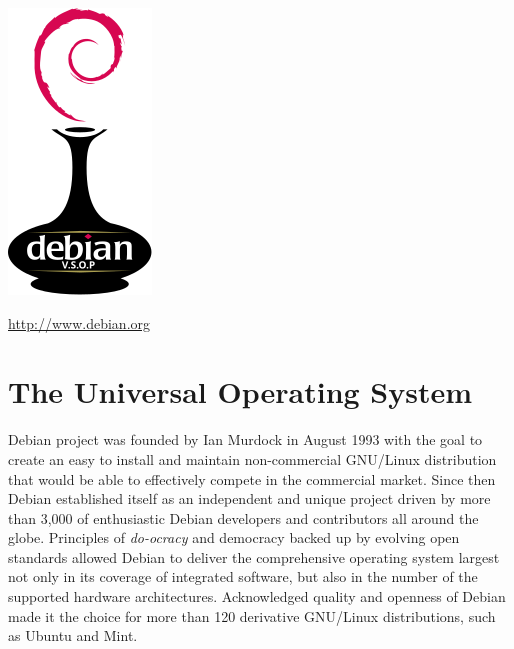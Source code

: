 \documentclass[letterpaper,landscape]{report}
\begin{document}
\begin{multicols}{3}    %

\begin{center}
\noindent
\includegraphics[width=0.5\columnwidth]{openlogo-vsop}

\url{http://www.debian.org}

\section*{The Universal Operating System}
\end{center}
\noindent
Debian project was founded by Ian Murdock in August 1993 with the goal
to create an easy to install and maintain non-commercial GNU/Linux
distribution that would be able to effectively compete in the
commercial market.  Since then Debian established itself as an
independent and unique project driven by more than 3,000 of
enthusiastic Debian developers and contributors all around the globe.
Principles of \emph{do-ocracy} and democracy backed up by evolving open
standards allowed Debian to deliver the comprehensive operating system largest not
only in its coverage of integrated software, but also in the
number of the supported hardware architectures.
Acknowledged quality and openness of Debian made it the choice for
more than 120 derivative GNU/Linux distributions, such as Ubuntu and
Mint.


\end{multicols}
\end{document}
